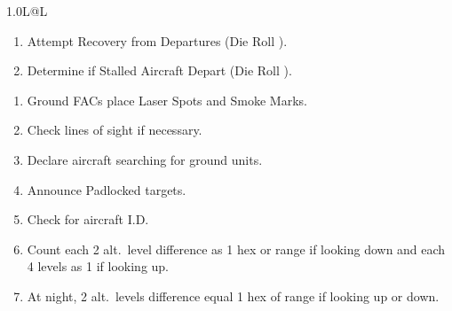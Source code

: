 \begin{twocolumntablefloat}
\begin{twocolumntable}
\begin{tabularx}{1.0\linewidth}{L@{\hspace{\columnsep}}L}

\begin{enumerate}[nosep]
    \item Attempt Recovery from Departures (Die Roll ).
    \item Determine if Stalled Aircraft Depart (Die Roll ).
\end{enumerate}


\begin{enumerate}[nosep]
    \item Ground FACs place Laser Spots and Smoke Marks.
    \item Check lines of sight if necessary.
    \item Declare aircraft searching for ground units.
    \item Announce Padlocked targets.
    \item Check for aircraft I.D.
    \item[--] Count each 2 alt.\ level difference as 1 hex or range if looking down and each 4 levels as 1 if looking up.
    \item[--] At night, 2 alt.\ levels difference equal 1 hex of range if looking up or down.
\end{enumerate}



\end{tabularx}
\end{twocolumntable}
\end{twocolumntablefloat}
